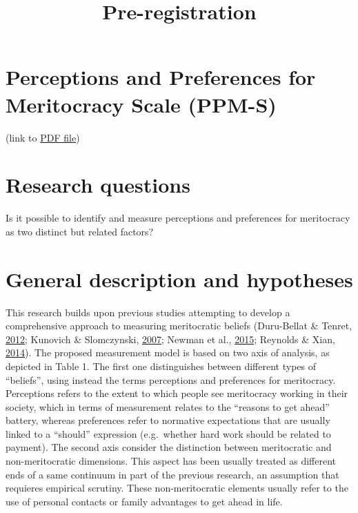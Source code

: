 \documentclass[
]{article}
\title{Pre-registration}
\author{}
\date{\vspace{-2.5em}}
\begin{document}
\maketitle

{
\hypersetup{linkcolor=}
\setcounter{tocdepth}{2}
\tableofcontents
}
\hypertarget{perceptions-and-preferences-for-meritocracy-scale-ppm-s}{%
\section{Perceptions and Preferences for Meritocracy Scale
(PPM-S)}\label{perceptions-and-preferences-for-meritocracy-scale-ppm-s}}

(link to \href{docs/preanalisis.pdf}{PDF file})

\hypertarget{research-questions}{%
\section{Research questions}\label{research-questions}}

Is it possible to identify and measure perceptions and preferences for
meritocracy as two distinct but related factors?

\hypertarget{general-description-and-hypotheses}{%
\section{General description and
hypotheses}\label{general-description-and-hypotheses}}

This research builds upon previous studies attempting to develop a
comprehensive approach to measuring meritocratic beliefs (Duru-Bellat \&
Tenret, \protect\hyperlink{ref-Duru-bellat2012}{2012}; Kunovich \&
Slomczynski, \protect\hyperlink{ref-Kunovich2007}{2007}; Newman et al.,
\protect\hyperlink{ref-Newman2015}{2015}; Reynolds \& Xian,
\protect\hyperlink{ref-Reynolds2014}{2014}). The proposed measurement
model is based on two axis of analysis, as depicted in Table 1. The
first one distinguishes between different types of ``beliefs'', using
instead the terms perceptions and preferences for meritocracy.
Perceptions refers to the extent to which people see meritocracy working
in their society, which in terms of measurement relates to the ``reasons
to get ahead'' battery, whereas preferences refer to normative
expectations that are usually linked to a ``should'' expression
(e.g.~whether hard work should be related to payment). The second axis
consider the distinction between meritocratic and non-meritocratic
dimensions. This aspect has been usually treated as different ends of a
same continuum in part of the previous research, an assumption that
requieres empirical scrutiny. These non-meritocratic elements usually
refer to the use of personal contacts or family advantages to get ahead
in life.
\end{document}

